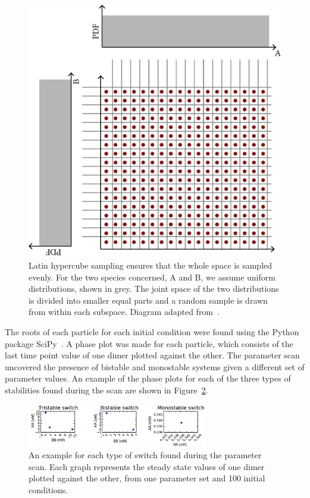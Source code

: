\begin{figure}[ht]
\begin{center}
\includegraphics[scale=0.5]{../../chapters/chapterABCSysBio/images/LHS.png}
\caption[Latin Hypercube sampling]{\label{fig:lhs}Latin hypercube sampling ensures that the whole space is sampled evenly. For the two species concerned, A and B, we assume uniform distributions, shown in grey. The joint space of the two distributions is divided into smaller equal parts and a random sample is drawn from within each subspace. Diagram adapted from~\textcite{Youssef:2013jv}.}
\end{center}
\end{figure}

The roots of each particle for each initial condition were found using the Python package SciPy~\autocite{Scipy}. A phase plot was made for each particle, which consists of the last time point value of one dimer plotted against the other. The parameter scan uncovered the presence of bistable and monostable systems given a different set of parameter values. An example of the phase plots for each of the three types of stabilities found during the scan are shown in Figure~\ref{fig:stab exampl}.

\begin{figure}[htbp]
\centering
\includegraphics[width=0.7\textwidth]{../../chapters/chapterABCSysBio/images/phase_plots_param_scan.png}
\caption[Phase space examples of a monostable and a bistable switch]{\label{fig:stab exampl}An example for each type of switch found during the parameter scan. Each graph represents the steady state values of one dimer plotted against the other, from one parameter set and 100 initial conditions.}
\end{figure}

